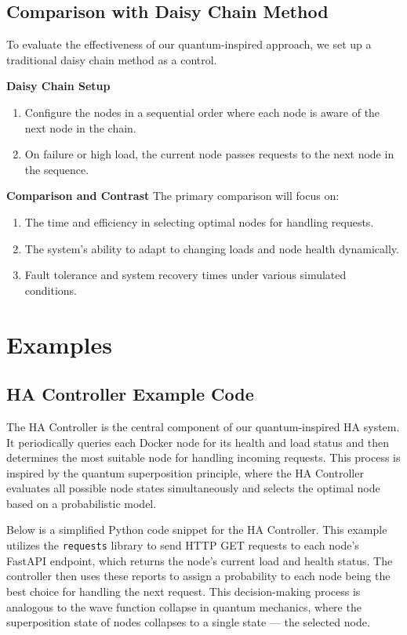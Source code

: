 \documentclass[12pt]{article}
\begin{document}
\subsection{Comparison with Daisy Chain Method}
To evaluate the effectiveness of our quantum-inspired approach, we set up a traditional daisy chain method as a control.

\textbf{Daisy Chain Setup}
\begin{enumerate}
    \item Configure the nodes in a sequential order where each node is aware of the next node in the chain.
    \item On failure or high load, the current node passes requests to the next node in the sequence.
\end{enumerate}

\textbf{Comparison and Contrast}
The primary comparison will focus on:
\begin{enumerate}
    \item The time and efficiency in selecting optimal nodes for handling requests.
    \item The system's ability to adapt to changing loads and node health dynamically.
    \item Fault tolerance and system recovery times under various simulated conditions.
\end{enumerate}

\newpage
\section{Examples}
\subsection{HA Controller Example Code}

The HA Controller is the central component of our quantum-inspired HA system. It periodically queries each Docker node for its health and load status and then determines the most suitable node for handling incoming requests. This process is inspired by the quantum superposition principle, where the HA Controller evaluates all possible node states simultaneously and selects the optimal node based on a probabilistic model.

Below is a simplified Python code snippet for the HA Controller. This example utilizes the \texttt{requests} library to send HTTP GET requests to each node's FastAPI endpoint, which returns the node's current load and health status. The controller then uses these reports to assign a probability to each node being the best choice for handling the next request. This decision-making process is analogous to the wave function collapse in quantum mechanics, where the superposition state of nodes collapses to a single state — the selected node.
\end{document}
